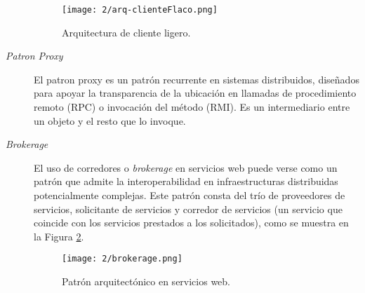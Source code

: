 \begin{description}
	\begin{figure}[h]%
		\texttt{[image: 2/arq-clienteFlaco.png]}
		\caption{Arquitectura de cliente ligero. }
		\label{fig:Arq-flaco}
	\end{figure}
	
 
	
		\item[\textit{Patron Proxy}] El \gls{patron proxy} es un patrón  recurrente en sistemas distribuidos, diseñados  para apoyar la transparencia de la ubicación en llamadas de procedimiento remoto (RPC) o invocación del método (RMI).  Es un intermediario entre un objeto y el resto que lo invoque.  
		
		\item[\textit{Brokerage}]
	
		 El uso de corredores o \textit{brokerage}  en servicios web puede verse  como un patrón que admite la interoperabilidad en infraestructuras distribuidas potencialmente complejas.	
		 Este patrón consta del trío de proveedores de servicios, solicitante de servicios y corredor de servicios (un servicio que coincide con los servicios prestados a los solicitados), como se muestra en la Figura \ref{fig:brokerage}.
		 
		 
		
	
				
		\begin{figure}[h]%
			\texttt{[image: 2/brokerage.png]} 
			\caption{Patr\'on arquitect\'onico en servicios web. }
			\label{fig:brokerage}
		\end{figure}
		
		

\end{description}
